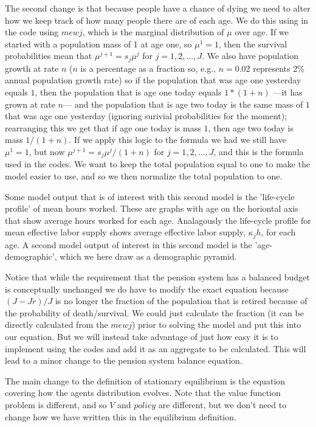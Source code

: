 The second change is that because people have a chance of dying we need to alter how we keep track of how many people there are of each age. We do this using in the code using $mewj$, which is the marginal distribution of $\mu$ over age. If we started with a population mass of 1 at age one, so $\mu^1=1$, then the survival probabilities mean that  $\mu^{j+1}=s_j \mu^j$ for $j=1,2,...,J$. We also have population growth at rate $n$ ($n$ is a percentage as a fraction so, e.g., $n=0.02$ represents 2\% annual population growth rate) so if the population that was age one yesterday equals $1$, then the population that is age one today equals $1*(1+n)$ ---it has grown at rate $n$--- and the population that is age two today is the same mass of $1$ that was age one yesterday (ignoring surivial probabilities for the moment); rearranging this we get that if age one today is mass $1$, then age two today is mass $1/(1+n)$. If we apply this logic to the formula we had we still have $\mu^1=1$, but now $\mu^{j+1}=s_j \mu^j/(1+n)$ for $j=1,2,...,J$, and this is the formula used in the codes. We want to keep the total population equal to one to make the model easier to use, and so we then normalize the total population to one.

Some model output that is of interest with this second model is the 'life-cycle profile' of mean hours worked. These are graphs with age on the horiontal axis that show average hours worked for each age. Analagously the life-cycle profile for mean effective labor supply shows average effective labor supply, $\kappa_j h$, for each age. A second model output of interest in this second model is the 'age-demographic', which we here draw as a demographic pyramid.

Notice that while the requirement that the pension system has a balanced budget is conceptually unchanged we do have to modify the exact equation because $(J-Jr)/J$ is no longer the fraction of the population that is retired because of the probability of death/survival. We could just calculate the fraction (it can be directly calculated from the $mewj$) prior to solving the model and put this into our equation. But we will instead take advantage of just how easy it is to implement using the codes and add it as an aggregate to be calculated. This will lead to a minor change to the pension system balance equation.

The main change to the definition of stationary equilibrium is the equation covering how the agents distribution evolves. Note that the value function problem is different, and so $V$ and $policy$ are different, but we don't need to change how we have written this in the equilibrium definition.

